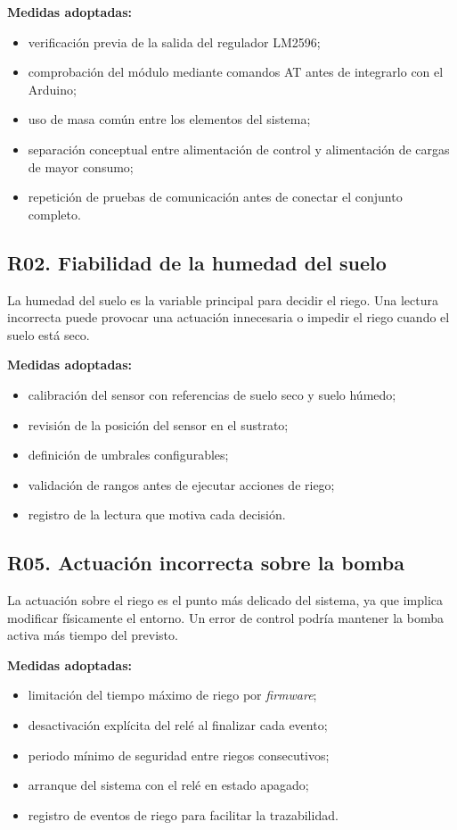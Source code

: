 \textbf{Medidas adoptadas:}

\begin{itemize}
    \item verificación previa de la salida del regulador LM2596;
    \item comprobación del módulo mediante comandos AT antes de integrarlo con el Arduino;
    \item uso de masa común entre los elementos del sistema;
    \item separación conceptual entre alimentación de control y alimentación de cargas de mayor consumo;
    \item repetición de pruebas de comunicación antes de conectar el conjunto completo.
\end{itemize}

\subsection{R02. Fiabilidad de la humedad del suelo}

La humedad del suelo es la variable principal para decidir el riego. Una lectura incorrecta puede provocar una actuación innecesaria o impedir el riego cuando el suelo está seco.

\textbf{Medidas adoptadas:}

\begin{itemize}
    \item calibración del sensor con referencias de suelo seco y suelo húmedo;
    \item revisión de la posición del sensor en el sustrato;
    \item definición de umbrales configurables;
    \item validación de rangos antes de ejecutar acciones de riego;
    \item registro de la lectura que motiva cada decisión.
\end{itemize}

\subsection{R05. Actuación incorrecta sobre la bomba}

La actuación sobre el riego es el punto más delicado del sistema, ya que implica modificar físicamente el entorno. Un error de control podría mantener la bomba activa más tiempo del previsto.

\textbf{Medidas adoptadas:}

\begin{itemize}
    \item limitación del tiempo máximo de riego por \textit{firmware};
    \item desactivación explícita del relé al finalizar cada evento;
    \item periodo mínimo de seguridad entre riegos consecutivos;
    \item arranque del sistema con el relé en estado apagado;
    \item registro de eventos de riego para facilitar la trazabilidad.
\end{itemize}


